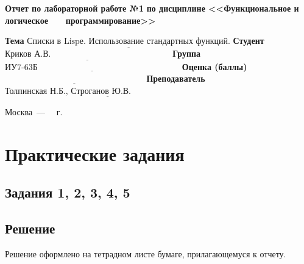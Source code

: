 \documentclass[12pt]{report}
\begin{document}
\begin{titlepage}
		\begin{center}
			\noindent\begin{minipage}{1.1\textwidth}\centering
				\Large\textbf{  Отчет по лабораторной работе №1}\newline
				\textbf{по дисциплине <<Функциональное и логическое}\newline
				\textbf{~~~программирование>>}\newline\newline
			\end{minipage}
		\end{center}
		
		\noindent\textbf{Тема} $\underline{\text{Списки в Lispе. Использование стандартных функций.}}$\newline\newline
		\noindent\textbf{Студент} $\underline{\text{Криков А.В.~~~~~~~~~~~~~~~~~~~~~~~~~~~~~~~~~~~~~~~~~~}}$\newline\newline
		\noindent\textbf{Группа} $\underline{\text{ИУ7-63Б~~~~~~~~~~~~~~~~~~~~~~~~~~~~~~~~~~~~~~~~~~~~~~~~~~}}$\newline\newline
		\noindent\textbf{Оценка (баллы)} $\underline{\text{~~~~~~~~~~~~~~~~~~~~~~~~~~~~~~~~~~~~~~~~~~~~~~~~~}}$\newline\newline
		\noindent\textbf{Преподаватель} $\underline{\text{Толпинская Н.Б., Строганов Ю.В.~~~~~~~~~~~~~~~~~~~~~~~~~~~~}}$\newline\newline\newline
		
		\begin{center}
			\vfill
			Москва~---~\the\year
			~г.
		\end{center}
	\end{titlepage}
	
	
	
	\chapter*{Практические задания}
	\section*{Задания 1, 2, 3, 4, 5}
		
	\section*{Решение}
	Решение оформлено на тетрадном листе бумаге, прилагающемуся к отчету.
	
\end{document}
